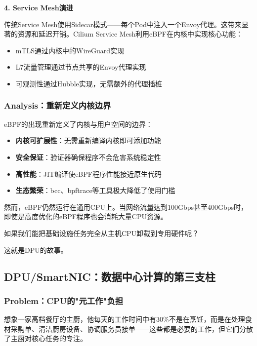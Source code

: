 \textbf{4. Service Mesh演进}

传统Service Mesh使用Sidecar模式——每个Pod中注入一个Envoy代理。这带来显著的资源和延迟开销。Cilium Service Mesh利用eBPF在内核中实现核心功能：
\begin{itemize}
    \item mTLS通过内核中的WireGuard实现
    \item L7流量管理通过节点共享的Envoy代理实现
    \item 可观测性通过Hubble实现，无需额外的代理插桩
\end{itemize}

\subsubsection{Analysis：重新定义内核边界}

eBPF的出现重新定义了内核与用户空间的边界：

\begin{itemize}
    \item \textbf{内核可扩展性}：无需重新编译内核即可添加功能
    \item \textbf{安全保证}：验证器确保程序不会危害系统稳定性
    \item \textbf{高性能}：JIT编译使eBPF程序性能接近原生代码
    \item \textbf{生态繁荣}：bcc、bpftrace等工具极大降低了使用门槛
\end{itemize}

然而，eBPF仍然运行在通用CPU上。当网络流量达到100Gbps甚至400Gbps时，即使是高度优化的eBPF程序也会消耗大量CPU资源。

如果我们能把基础设施任务完全从主机CPU卸载到专用硬件呢？

这就是DPU的故事。

\subsection{DPU/SmartNIC：数据中心计算的第三支柱}

\subsubsection{Problem：CPU的"元工作"负担}

想象一家高档餐厅的主厨，他每天的工作时间中有30\%不是在烹饪，而是在处理食材采购单、清洁厨房设备、协调服务员接单——这些都是必要的工作，但它们分散了主厨对核心任务的专注。

